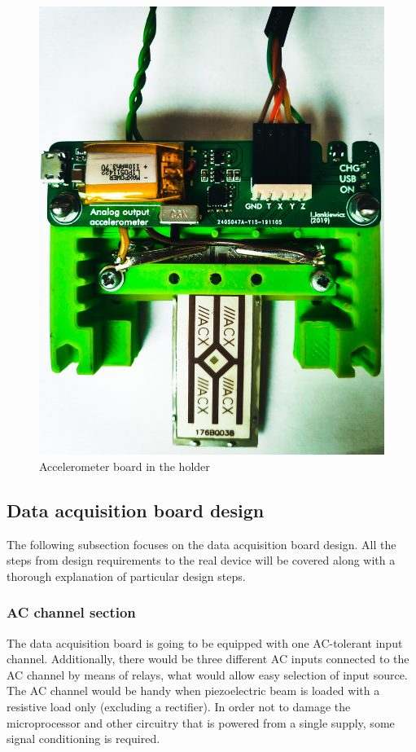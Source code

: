 \documentclass[12pt,a4paper]{article}
\begin{document}
\begin{figure}[ht!]
\includegraphics[scale=0.1]{piezoboard.jpg}
\caption{Accelerometer board in the holder}
\label{fig:piezoboard}
\end{figure}

\par

\subsection{Data acquisition board design}

The following subsection focuses on the data acquisition board design. All the steps from design requirements to the real device will be covered along with a thorough explanation of particular design steps.

\subsubsection{AC channel section}
The data acquisition board is going to be equipped with one AC-tolerant input channel. Additionally, there would be three different AC inputs connected to the AC channel by means of relays, what would allow easy selection of input source. The AC channel would be handy when piezoelectric beam is loaded with a resistive load only (excluding a rectifier). In order not to damage the microprocessor and other circuitry that is powered from a single supply, some signal conditioning is required. 
\par
\end{document}
